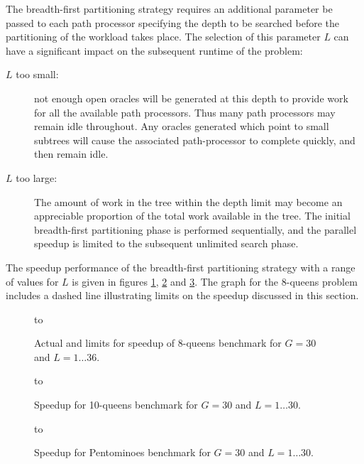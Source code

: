 The breadth-first partitioning strategy requires an additional parameter be passed to each
path processor specifying the depth to be searched before the partitioning of the workload 
takes place.  The selection of this parameter $L$ can have a significant impact on the
subsequent runtime of the problem:
\begin{description}
\item[$L$ too small:]{ not enough open oracles will be generated at this depth to provide work
  for all the available path processors.  Thus many path processors may remain idle throughout.
  Any oracles generated which point to small subtrees will cause the associated path-processor
  to complete quickly, and then remain idle.}
\item[$L$ too large:]{ The amount of work in the tree within the depth limit may become an
  appreciable proportion of the total work available in the tree.  The initial breadth-first
  partitioning phase is performed sequentially, and the parallel speedup is limited to the
  subsequent unlimited search phase.}
\end{description}

The speedup performance of the breadth-first partitioning strategy with a range of values for
$L$ is given in figures \ref{q8_cut_c_G_30_spdup}, \ref{q10_cut_c_G_30_spdup} and 
\ref{pent_cut_c_G_30_spdup}.  The graph for the 8-queens problem
includes a dashed line illustrating
limits on the speedup discussed in this section.

\begin{figure}[htb]
\vspace{5mm} \hbox to 
\caption{Actual and limits for speedup of 8-queens benchmark for $G=30$ and $L=1\ldots 36$.}
\vspace{5mm}
\label{q8_cut_c_G_30_spdup}
\end{figure}

\begin{figure}[htb]
\vspace{5mm} \hbox to 
\caption{Speedup for 10-queens benchmark for $G=30$ and $L=1\ldots 30$.}
\vspace{5mm}
\label{q10_cut_c_G_30_spdup}
\end{figure}

\begin{figure}[htb]
\vspace{5mm} \hbox to 
\caption{Speedup for Pentominoes benchmark for $G=30$ and $L=1\ldots 30$.}
\vspace{5mm}
\label{pent_cut_c_G_30_spdup}
\end{figure}

